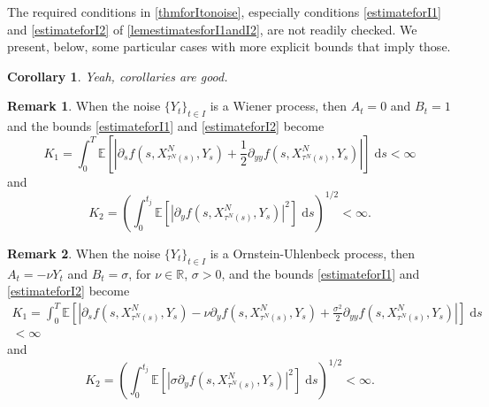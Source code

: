 \documentclass[reqno,12pt]{amsart}
\theoremstyle{plain}%
\newtheorem{cor}{Corollary}[section]
\theoremstyle{definition}
\newtheorem{rmk}{Remark}[section]
\begin{document}
The required conditions in \cref{thmforItonoise}, especially conditions \eqref{estimateforI1} and \eqref{estimateforI2} of \cref{lemestimatesforI1andI2}, are not readily checked. We present, below, some particular cases with more explicit bounds that imply those.

\begin{cor}
    Yeah, corollaries are good.
\end{cor}

\begin{rmk}
    When the noise $\{Y_t\}_{t\in I}$ is a Wiener process, then $A_t = 0$ and $B_t = 1$ and the bounds \eqref{estimateforI1} and \eqref{estimateforI2} become
    \begin{equation}
        K_1 = \int_0^{T}
        \mathbb{E}\left[\left|\partial_s f(s, X_{\tau^N(s)}^N, Y_s) + \frac{1}{2}\partial_{yy}f(s, X_{\tau^N(s)}^N, Y_s) \right|\right] \;\mathrm{d}s
        < \infty
    \end{equation}
    and
    \begin{equation}
        K_2 = \left(\int_0^{t_j} \mathbb{E}\left[\left|\partial_y f(s, X_{\tau^N(s)}^N, Y_s)\right|^2\right] \;\mathrm{d}s\right)^{1/2} < \infty.
    \end{equation}
\end{rmk}

\begin{rmk}
    When the noise $\{Y_t\}_{t\in I}$ is a Ornstein-Uhlenbeck process, then $A_t = -\nu Y_t$ and $B_t = \sigma$, for $\nu\in \mathbb{R}$, $\sigma > 0$, and the bounds \eqref{estimateforI1} and \eqref{estimateforI2} become
    \begin{multline}
        K_1 = \int_0^{T}
        \mathbb{E}\left[\left|\partial_s f(s, X_{\tau^N(s)}^N, Y_s) -\nu \partial_y f(s, X_{\tau^N(s)}^N, Y_s) + \frac{\sigma^2}{2}\partial_{yy}f(s, X_{\tau^N(s)}^N, Y_s) \right|\right] \;\mathrm{d}s \\
        < \infty
    \end{multline}
    and
    \begin{equation}
        K_2 = \left(\int_0^{t_j} \mathbb{E}\left[\left|\sigma \partial_y f(s, X_{\tau^N(s)}^N, Y_s)\right|^2\right] \;\mathrm{d}s\right)^{1/2} < \infty.
    \end{equation}
\end{rmk}
\end{document}
